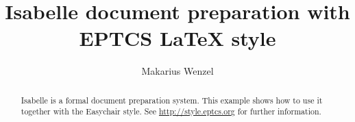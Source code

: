 \documentclass[submission,copyright,creativecommons]{eptcs}
\begin{document}
\title{Isabelle document preparation with EPTCS {\LaTeX} style}
\def\titlerunning{Easychair style}
\author{Makarius Wenzel
  }
\def\authorrunning{M. Wenzel}
\maketitle

\begin{abstract}
Isabelle is a formal document preparation system. This example shows how to
use it together with the Easychair style. See \url{http://style.eptcs.org} for
further information.
\end{abstract}





\end{document}
